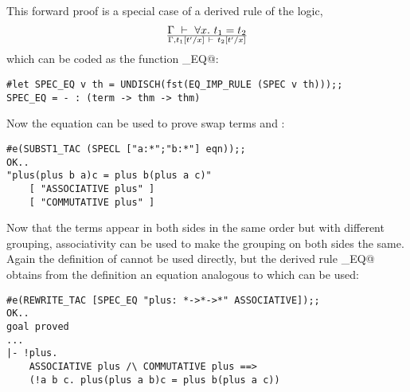 This forward proof is a special case of a derived
rule of the logic,
\[
\Gamma\ \vdash\  \forall x.\  t_1 = t_2
\over
\Gamma, t_1[t'/x] \ \vdash\  t_2[t'/x]
\]
which can be coded as the \ML{} function \verb@SPEC_EQ@:
\begin{session}
\begin{verbatim}
#let SPEC_EQ v th = UNDISCH(fst(EQ_IMP_RULE (SPEC v th)));;
SPEC_EQ = - : (term -> thm -> thm)
\end{verbatim}
\end{session}
Now the equation \verb@eqn@ can be used to prove swap terms
\verb@a@ and \verb@b@:
\begin{session}
\begin{verbatim}
#e(SUBST1_TAC (SPECL ["a:*";"b:*"] eqn));;
OK..
"plus(plus b a)c = plus b(plus a c)"
    [ "ASSOCIATIVE plus" ]
    [ "COMMUTATIVE plus" ]
\end{verbatim}
\end{session}
Now that the terms appear in both sides in the same order but with different 
grouping, associativity can be used to make the grouping on both sides 
the same.  Again the definition of \verb@ASSOCIATIVE@ cannot be used
directly, but the derived rule \verb@SPEC_EQ@ obtains from the definition
an equation analogous to \verb@eqn@ which can be used:
\begin{session}
\begin{verbatim}
#e(REWRITE_TAC [SPEC_EQ "plus: *->*->*" ASSOCIATIVE]);;
OK..
goal proved
...
|- !plus.
    ASSOCIATIVE plus /\ COMMUTATIVE plus ==>
    (!a b c. plus(plus a b)c = plus b(plus a c))
\end{verbatim}
\end{session}

